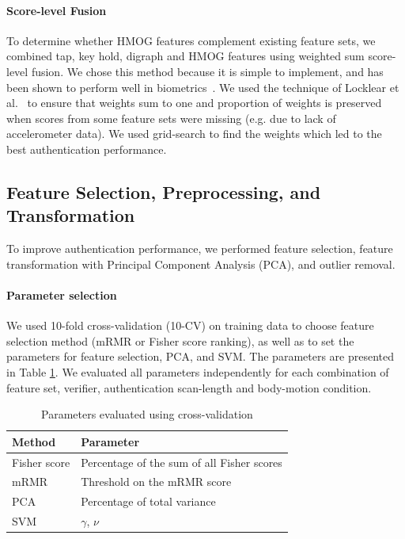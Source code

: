 \paragraph{Score-level Fusion}
To determine whether HMOG features complement existing feature sets, we combined tap, key hold, digraph and HMOG features using weighted sum score-level fusion. We chose this method because it is simple to implement, and has been shown to perform well in biometrics~\cite{ross2003}. We used the technique of Locklear et al.~\cite{locklear2014} to ensure that weights sum to one and proportion of weights is preserved when scores from some feature sets were missing (e.g. due to lack of accelerometer data). We used grid-search to find the weights which led to the best authentication performance.


\subsection{Feature Selection, Preprocessing, and Transformation} \label{featurePreparation}
To improve  authentication performance, we performed feature selection, feature transformation with Principal Component Analysis (PCA), and outlier removal. %
%
%
%
%
%
%


%

\paragraph{Parameter selection}
We used 10-fold cross-validation (10-CV) on training data to choose feature selection method (mRMR or Fisher score ranking), as well as to set the parameters for feature selection, PCA, and SVM. The parameters are presented in Table \ref{cvparams}. We evaluated all parameters independently for each combination of feature set, verifier, authentication scan-length and body-motion condition. 

\begin{table}
\caption{Parameters evaluated using cross-validation} \centering
\begin{tabular}{ l  l  }
\hline
Method & Parameter \\ \hline
Fisher score & Percentage of the sum of all Fisher scores \\
mRMR & Threshold on the mRMR score\\
PCA & Percentage of total variance \\
SVM & $\gamma$, $\nu$ \\
\hline
\end{tabular}
\label{cvparams}
\end{table}



